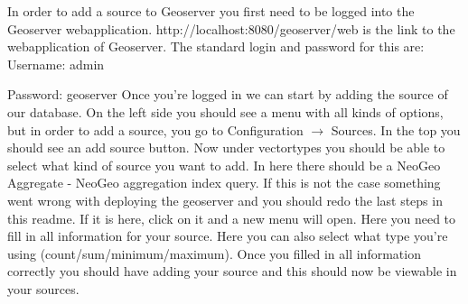 In order to add a source to Geoserver you first need to be logged into the Geoserver webapplication. http://localhost:8080/geoserver/web is the link to the webapplication of Geoserver. The standard login and password for this are:
\newline
\newline
Username: admin

\noindent Password: geoserver
\newline
\newline
Once you're logged in we can start by adding the source of our database. On the left side you should see a menu with all kinds of options, but in order to add a source, you go to Configuration $\rightarrow$ Sources. In the top you should see an add source button. Now under vectortypes you should be able to select what kind of source you want to add. In here there should be a NeoGeo Aggregate - NeoGeo aggregation index query. If this is not the case something went wrong with deploying the geoserver and you should redo the last steps in this readme. If it is here, click on it and a new menu will open. Here you need to fill in all information for your source. Here you can also select what type you're using (count/sum/minimum/maximum). Once you filled in all information correctly you should have adding your source and this should now be viewable in your sources.